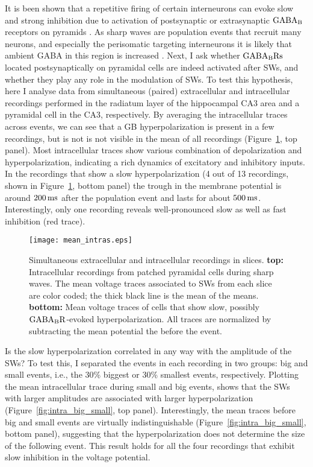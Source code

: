     It is been shown that a repetitive firing of certain interneurons can evoke
    slow and strong inhibition due to activation of postsynaptic or
    extrasynaptic $\rm GABA_B$ receptors on pyramids \citep{Scanziani2000,
    Gassmann2012}. As sharp waves are population events that recruit many
    neurons, and especially the perisomatic targeting interneurons
    \citep{Klausberg2009} it is likely that ambient GABA in this region is
    increased \citep{Hollnagel2014, Lang2014}. Next, I ask whether $\rm
    GABA_BRs$ located postsynaptically on pyramidal cells are indeed activated
    after SWs, and whether they play any role in the modulation of SWs. To test
    this hypothesis, here I analyse data from simultaneous (paired)
    extracellular and intracellular recordings performed in the radiatum layer
    of the hippocampal CA3 area and a pyramidal cell in the CA3, respectively.
    By averaging the intracellular traces across events, we can see that a GB
    hyperpolarization is present in a few recordings, but is not is not visible
    in the mean of all recordings (Figure~\ref{fig:intra_means}, top panel).
    Most intracellular traces show various combination of depolarization and
    hyperpolarization, indicating a rich dynamics of excitatory and inhibitory
    inputs. In the recordings that show a slow hyperpolarization (4 out of 13
    recordings, shown in Figure~\ref{fig:intra_means}, bottom panel) the trough
    in the membrane potential is around $200 \, \rm ms$ after the population
    event and lasts for about $500 \, \rm ms$. Interestingly, only one
    recording reveals well-pronounced slow as well as fast inhibition (red
    trace).

   \begin{figure}
      \texttt{[image: mean\_intras.eps]}
      \caption{ 
        Simultaneous extracellular and intracellular recordings in slices. {\bf
        top:} Intracellular recordings from patched pyramidal cells during
        sharp waves. The mean voltage traces associated to SWs from each slice
        are color coded; the thick black line is the mean of the means. {\bf
        bottom:} Mean voltage traces of cells that show slow, possibly $\rm
        GABA_BR$-evoked hyperpolarization. All traces are normalized by
        subtracting the mean potential the before the event.
              }
      \label{fig:intra_means}
    \end{figure}

    Is the slow hyperpolarization correlated in any way with the amplitude of
    the SWs? To test this, I separated the events in each recording in two
    groups: big and small events, i.e., the 30\% biggest or 30\%
    smallest events, respectively. Plotting the mean intracellular trace during
    small and big events, shows that the SWs with larger amplitudes are
    associated with larger hyperpolarization (Figure~\ref{fig:intra_big_small},
    top panel). Interestingly, the mean traces before big and small events are
    virtually indistinguishable (Figure~\ref{fig:intra_big_small}, bottom
    panel), suggesting that the hyperpolarization does not determine the size
    of the following event. This result holds for all the four recordings that
    exhibit slow inhibition in the voltage potential.
    
